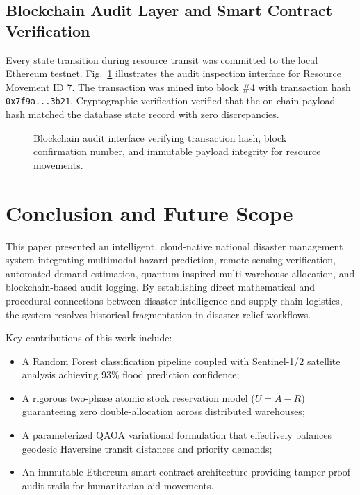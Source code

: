 \documentclass[conference]{IEEEtran}
\begin{document}
\subsection{Blockchain Audit Layer and Smart Contract Verification}
Every state transition during resource transit was committed to the local Ethereum testnet. Fig.~\ref{fig:blockchain} illustrates the audit inspection interface for Resource Movement ID 7. The transaction was mined into block \#4 with transaction hash \texttt{0x7f9a...3b21}. Cryptographic verification verified that the on-chain payload hash matched the database state record with zero discrepancies.

\begin{figure}[h]
\centering
\fbox{\rule{0pt}{1.8in} \rule{0.9\linewidth}{0pt}}
\caption{Blockchain audit interface verifying transaction hash, block confirmation number, and immutable payload integrity for resource movements.}
\label{fig:blockchain}
\end{figure}

\section{Conclusion and Future Scope}
This paper presented an intelligent, cloud-native national disaster management system integrating multimodal hazard prediction, remote sensing verification, automated demand estimation, quantum-inspired multi-warehouse allocation, and blockchain-based audit logging. By establishing direct mathematical and procedural connections between disaster intelligence and supply-chain logistics, the system resolves historical fragmentation in disaster relief workflows.

Key contributions of this work include:
\begin{itemize}
    \item A Random Forest classification pipeline coupled with Sentinel-1/2 satellite analysis achieving 93\% flood prediction confidence;
    \item A rigorous two-phase atomic stock reservation model ($U = A - R$) guaranteeing zero double-allocation across distributed warehouses;
    \item A parameterized QAOA variational formulation that effectively balances geodesic Haversine transit distances and priority demands;
    \item An immutable Ethereum smart contract architecture providing tamper-proof audit trails for humanitarian aid movements.
\end{itemize}
\end{document}
